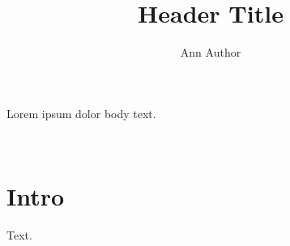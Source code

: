 \documentclass{article}
\title{Header Title}\author{Ann Author}
\begin{document}
\noindent{} Lorem ipsum dolor body text.

\begin{center}{\Large\@title}\\[1em]\@author\end{center}
\section{Intro}
Text.
\end{document}
